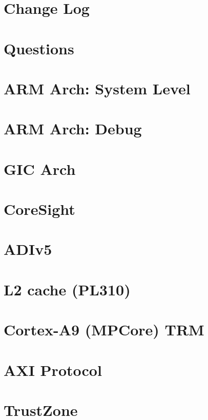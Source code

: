 \documentclass[10pt,oneside]{book}
\begin{document}
\begin{CJK*}{UTF8}{gbsn}
\chapter{Change Log}\label{sec:chg log}
\chapter{Questions}\label{sec:question}
\chapter{ARM Arch: System Level}\label{sec:arm arch part b}
\chapter{ARM Arch: Debug}
\chapter{GIC Arch}
\chapter{CoreSight}
\chapter{ADIv5}
\chapter{L2 cache (PL310)}
\chapter{Cortex-A9 (MPCore) TRM}
\chapter{AXI Protocol}
\chapter{TrustZone}\label{sec:rd tsz}


\clearpage
{}
\label{sec:bib}


\clearpage
{}
\label{sec:index}\printindex



\clearpage




\end{CJK*}
\end{document}
